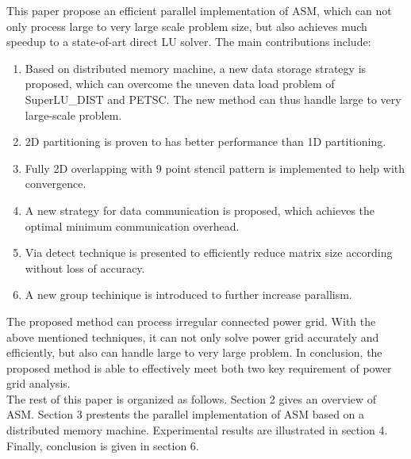 \documentclass{sig-alternate}
\begin{document}
	This paper propose an efficient parallel implementation of ASM, which can not only process large to very large scale problem size, 
	but also achieves much speedup to a state-of-art direct LU solver. The main contributions include:\\
	\begin{enumerate}[1)]
	\item Based on distributed memory machine, a new data storage strategy is proposed, which can overcome the uneven data 
	load problem of SuperLU\_DIST and PETSC. The new method can thus handle large to very large-scale problem.
	\item 2D partitioning is proven to has better performance than 1D partitioning. 
	\item Fully 2D overlapping with 9 point stencil pattern is implemented to help with convergence. 
	\item A new strategy for data communication is proposed, which achieves the optimal minimum communication overhead.
	\item Via detect technique is presented to efficiently reduce matrix size according without loss of accuracy.
	\item A new group techinique is introduced to further increase parallism.\\
	\end{enumerate}

	The proposed method can process irregular connected power grid. With the above mentioned techniques, it can not only solve 
	power grid accurately and efficiently, but also can handle large to very large problem. In conclusion, the proposed method 
	is able to effectively meet both two key requirement of power grid analysis.\\

	The rest of this paper is organized as follows. Section 2 gives an overview of ASM. Section 3 prestents 
	the parallel implementation of ASM based on a distributed memory machine. Experimental results are illustrated in section 4. 
	Finally, conclusion is given in section 6.
\end{document}
